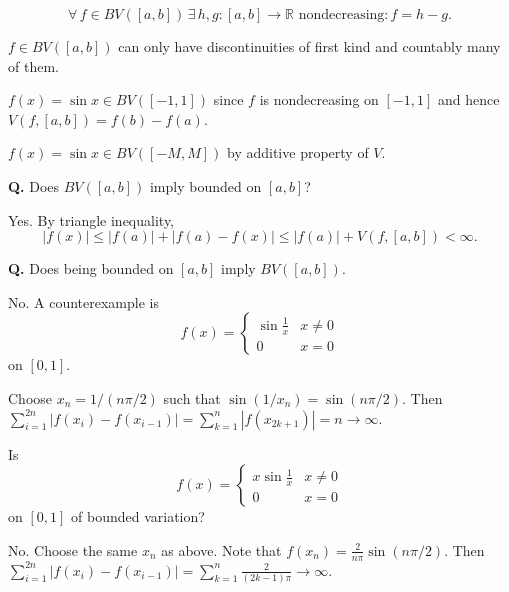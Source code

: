 \documentclass{notes}
\begin{document}
  \begin{thm}
    \[
      \forall \, f \in BV([a, b]) \, \exists \, h, g \colon [a, b] \to \mathbb R \text{ nondecreasing}: f = h - g.
    \]
  \end{thm}
  
  \begin{cor}
    $f \in BV([a, b])$ can only have discontinuities of first kind and countably many of them.
  \end{cor}
  
  \begin{eg}
    $f(x) = \sin x \in BV([-1, 1])$ since $f$ is nondecreasing on $[-1, 1]$ and hence $V(f, [a, b]) = f(b) - f(a)$.
  \end{eg}
  
  \begin{eg}
    $f(x) = \sin x \in BV([-M, M])$ by additive property of $V$.
  \end{eg}
  
  {\boldmath \bfseries Q.} Does $BV([a, b])$ imply bounded on $[a, b]$?

  Yes.
  By triangle inequality, 
  \[
    \left | f(x) \right | \leq \left | f(a) \right | + \left | f(a) - f(x) \right | \leq \left | f(a) \right | + V(f, [a, b]) < \infty.
  \]
  
  {\boldmath \bfseries Q.} Does being bounded on $[a, b]$ imply $BV([a, b])$.

  No.
  A counterexample is 
  \[
    f(x) = \begin{cases}
      \sin \frac{1}{x} & x \neq 0 \\ 
      0 & x = 0
    \end{cases}
  \]
  on $[0, 1]$.
  
  Choose $x_n = 1 / (n \pi / 2)$ such that $\sin(1 / x_n) = \sin(n \pi / 2)$.
  Then $\sum_{i = 1}^{2 n} \left | f(x_i) - f(x_{i - 1}) \right | = \sum_{k = 1}^n \left | f(x_{2 k + 1}) \right | = n \to \infty$.
  
  \begin{eg}
    Is 
    \[
      f(x) = \begin{cases}
        x \sin \frac{1}{x} & x \neq 0 \\ 
        0 & x = 0
      \end{cases}
    \]
    on $[0, 1]$ of bounded variation?
    
    No.
    Choose the same $x_n$ as above.
    Note that $f(x_n) = \frac{2}{n \pi} \sin(n \pi / 2)$.
    Then $\sum_{i = 1}^{2 n} \left | f(x_i) - f(x_{i - 1}) \right | = \sum_{k = 1}^n \frac{2}{(2 k - 1) \pi} \to \infty$.
  \end{eg}
  
\end{document}
